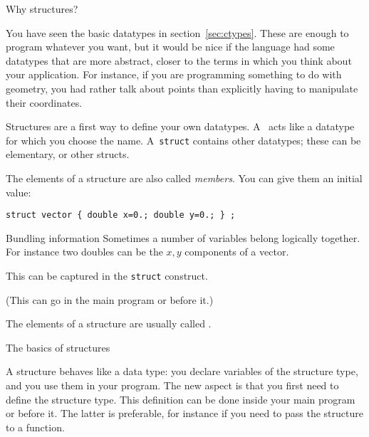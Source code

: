 
 {Why structures?}
\label{sec:struct}

You have seen the basic datatypes in section~\ref{sec:ctypes}. These
are enough to program whatever you want, but it would be nice if the
language had some datatypes that are more abstract, closer to the
terms in which you think about your application. For instance, if you
are programming something to do with geometry, you had rather talk
about points than explicitly having to manipulate their coordinates.

Structures are a
first way to define your own datatypes. A~
acts like a datatype for which you choose the name. A~\lstinline$struct$
contains other datatypes; these can be elementary, or other structs.
%

The elements of a structure are also called
\emph{members}.
You can give them an initial value:
\begin{lstlisting}
struct vector { double x=0.; double y=0.; } ;
\end{lstlisting}
  
\begin{slide}{Bundling information}
  \label{sl:struct-why}
  Sometimes a number of variables belong logically together. For
  instance two doubles can be the $x,y$ components of a vector.

  This can be captured in the \lstinline$struct$ construct.


  (This can go in the main program or before it.)

The elements of a structure are usually called .
\end{slide}

 {The basics of structures}

A structure behaves like a data type: you declare variables of the
structure type, and you use them in your program. The new aspect is
that you first need to define the structure type. This definition can
be done inside your main program or before it. The latter is
preferable, for instance if you need to pass the structure to a function.

